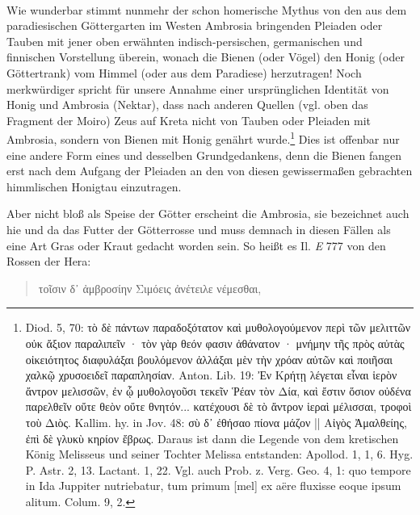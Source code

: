 \documentclass[a4paper, 11pt, oneside]{article}
\begin{document}
\paragraph{}
Wie wunderbar stimmt nunmehr der schon homerische Mythus von den aus dem paradiesischen Göttergarten im Westen Ambrosia bringenden Pleiaden oder Tauben mit jener oben erwähnten indisch-persischen, germanischen und finnischen Vorstellung überein, wonach die Bienen (oder Vögel) den Honig (oder Göttertrank) vom Himmel (oder aus dem Paradiese) herzutragen! Noch merkwürdiger spricht für unsere Annahme einer ursprünglichen Identität von Honig und Ambrosia (Nektar), dass nach anderen Quellen (vgl. oben das Fragment der Moiro) Zeus auf Kreta nicht von Tauben oder Pleiaden mit Ambrosia, sondern von Bienen mit Honig genährt wurde.\footnote{Diod. 5, 70: τὸ δὲ πάντων παραδοξότατον καὶ μυθολογούμενον περὶ τῶν μελιττῶν οὐκ ἄξιον παραλιπεῖν · τὸν γὰρ θεόν φασιν ἀθάνατον · μνήμην τῆς πρὸς αὐτὰς οἰκειότητος διαφυλάξαι βουλόμενον ἀλλάξαι μὲν τὴν χρόαν αὐτῶν καὶ ποιῆσαι χαλκῷ χρυσοειδεῖ παραπλησίαν. Anton. Lib. 19: Ἐν Κρήτῃ λέγεται εἶναι ἱερὸν ἄντρον μελισσῶν, ἐν ᾧ μυθολογοῦσι τεκεῖν Ῥέαν τὸν Δία, καὶ ἔστιν ὅσιον οὐδένα παρελθεῖν οὔτε θεὸν οὔτε θνητόν... κατέχουσι δὲ τὸ ἄντρον ἱεραὶ μέλισσαι, τροφοὶ τοὺ Διὸς. Kallim. hy. in Jov. 48: σὺ δ᾽ ἐθήσαο πίονα μάζον || Αἰγὸς Ἀμαλθείης, ἐπὶ δὲ γλυκὺ κηρίον ἔβρως. Daraus ist dann die Legende von dem kretischen König Melisseus und seiner Tochter Melissa entstanden: Apollod. 1, 1, 6. Hyg. P. Astr. 2, 13. Lactant. 1, 22. Vgl. auch Prob. z. Verg. Geo. 4, 1: quo tempore in Ida Juppiter nutriebatur, tum primum [mel] ex aëre fluxisse eoque ipsum alitum. Colum. 9, 2.} Dies ist offenbar nur eine andere Form eines und desselben Grundgedankens, denn die Bienen fangen erst nach dem Aufgang der Pleiaden an den von diesen gewissermaßen gebrachten himmlischen Honigtau einzutragen.

Aber nicht bloß als Speise der Götter erscheint die Ambrosia, sie bezeichnet auch hie und da das Futter der Götterrosse und muss demnach in diesen Fällen als eine Art Gras oder Kraut gedacht worden sein. So heißt es Il. \emph{E} 777 von den Rossen der Hera:
\begin{quotation}\large
τοῖσιν δ᾽ ἀμβροσίην Σιμόεις ἀνέτειλε νέμεσθαι,
\end{quotation}
\end{document}
